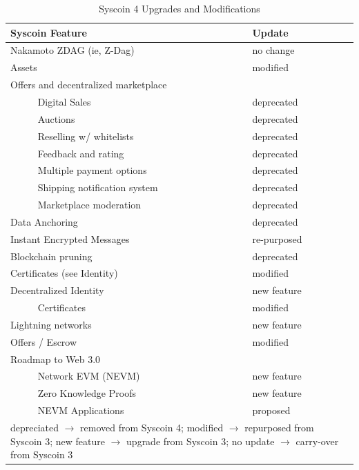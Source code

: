 \documentclass[peerreview]{ieeesyscoin}
\begin{document}
\begin{table}[h!]
\caption{Syscoin 4 Upgrades and Modifications}
\label{table:ugrades}
\setlength{\tabcolsep}{3pt}
\begin{tabular}{|p{135pt}|p{75pt}|}
\hline
Syscoin Feature & 
Update \\

\hline
Nakamoto ZDAG (ie, Z-Dag) & no change \\
Assets & modified \\

Offers and decentralized marketplace &   \\
~~~~~ Digital Sales &  deprecated \\
~~~~~ Auctions &  deprecated \\
~~~~~ Reselling w/ whitelists &  deprecated \\
~~~~~ Feedback and rating &  deprecated \\
~~~~~ Multiple payment options &  deprecated \\
~~~~~ Shipping notification system &  deprecated \\
~~~~~ Marketplace moderation &  deprecated \\

Data Anchoring &  deprecated \\
Instant Encrypted Messages &  re-purposed \\
Blockchain pruning &  deprecated \\
Certificates (see Identity) &  modified \\
Decentralized Identity &  new feature \\
~~~~~ Certificates &  modified \\
Lightning networks &  new feature \\
Offers / Escrow &  modified \\
Roadmap to Web 3.0 & \\
~~~~~ Network EVM (NEVM) &  new feature  \\
~~~~~ Zero Knowledge Proofs &  new feature \\
~~~~~ NEVM Applications &  proposed \\

\hline
\multicolumn{2}{p{251pt}}{depreciated  $\rightarrow$ removed from Syscoin 4; modified  $\rightarrow$ repurposed from Syscoin 3; new feature  $\rightarrow$ upgrade from Syscoin 3; no update $\rightarrow$ carry-over from Syscoin 3}\\

\end{tabular}
\label{tab1}
\end{table}
\end{document}
